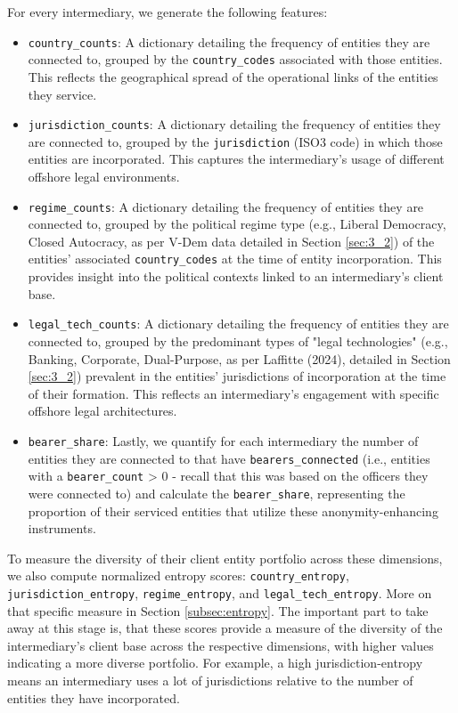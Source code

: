For every intermediary, we generate the following features:

\begin{itemize}
   \item \texttt{country\_counts}: A dictionary detailing the frequency of entities they are connected to, grouped by the \texttt{country\_codes} associated with those entities. This reflects the geographical spread of the operational links of the entities they service. 
   \item \texttt{jurisdiction\_counts}: A dictionary detailing the frequency of entities they are connected to, grouped by the \texttt{jurisdiction} (ISO3 code) in which those entities are incorporated. This captures the intermediary's usage of different offshore legal environments.
   \item \texttt{regime\_counts}: A dictionary detailing the frequency of entities they are connected to, grouped by the political regime type (e.g., Liberal Democracy, Closed Autocracy, as per V-Dem data detailed in Section \ref{sec:3_2}) of the entities' associated \texttt{country\_codes} at the time of entity incorporation. This provides insight into the political contexts linked to an intermediary's client base. 
   \item \texttt{legal\_tech\_counts}: A dictionary detailing the frequency of entities they are connected to, grouped by the predominant types of "legal technologies" (e.g., Banking, Corporate, Dual-Purpose, as per Laffitte (2024), detailed in Section \ref{sec:3_2}) prevalent in the entities' jurisdictions of incorporation at the time of their formation. This reflects an intermediary's engagement with specific offshore legal architectures.
   \item \texttt{bearer\_share}: Lastly, we quantify for each intermediary the number of entities they are connected to that have \texttt{bearers\_connected} (i.e., entities with a \texttt{bearer\_count} > 0 - recall that this was based on the officers they were connected to) and calculate the \texttt{bearer\_share}, representing the proportion of their serviced entities that utilize these anonymity-enhancing instruments.
\end{itemize}

To measure the diversity of their client entity portfolio across these dimensions, we also compute normalized entropy scores: \texttt{country\_entropy}, \texttt{jurisdiction\_entropy}, \texttt{regime\_entropy}, and \texttt{legal\_tech\_entropy}. More on that specific measure in Section \ref{subsec:entropy}. The important part to take away at this stage is, that these scores provide a measure of the diversity of the intermediary's client base across the respective dimensions, with higher values indicating a more diverse portfolio. For example, a high jurisdiction-entropy means an intermediary uses a lot of jurisdictions relative to the number of entities they have incorporated.

